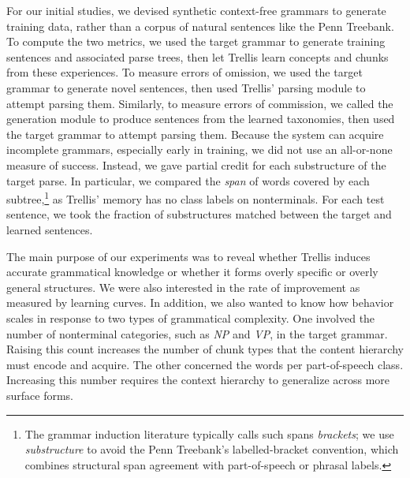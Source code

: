 \documentclass[11pt,letterpaper]{article}
\def\trellis/{{\sc Trellis}}
\begin{document}
For our initial studies, we devised synthetic context-free grammars
to generate training data, rather than a corpus of natural sentences
like the Penn Treebank. To compute the two metrics, we used the target
grammar to generate training sentences and associated parse trees,
then let \trellis/ learn concepts and chunks from these experiences.
To measure errors of omission, we used the target grammar to generate
novel sentences, then used \trellis/' parsing module to attempt
parsing them. Similarly, to measure errors of commission, we called
the generation module to produce sentences from the learned taxonomies,
then used the target grammar to attempt parsing them.
Because the system can acquire incomplete grammars, especially early
in training, we did not use an all-or-none measure of success.
Instead, we gave partial credit for each substructure of the target
parse. In particular, we compared the {\it span\/} of words covered
by each subtree,\footnote{The grammar induction literature 
typically calls such spans {\it brackets\/}; we use {\it substructure\/}
to avoid the Penn Treebank's labelled-bracket convention, which
combines structural span agreement with part-of-speech or phrasal
labels.} as \trellis/' memory has no class labels on nonterminals.
For each test sentence, we took the fraction of substructures matched
between the target and learned sentences.

The main purpose of our experiments was to reveal whether \trellis/
induces accurate grammatical knowledge or whether it forms overly
specific or overly general structures. We were also interested in
the rate of improvement as measured by learning curves. In addition,
we also wanted to know how behavior scales in response to two types
of grammatical complexity. One involved the number of nonterminal
categories, such as {\sl NP} and {\sl VP}, in the target grammar.
Raising this count increases the number of chunk types that the content
hierarchy must encode and acquire. The other concerned the words per
part-of-speech class. Increasing this number requires the context
hierarchy to generalize across more surface forms.


\end{document}
